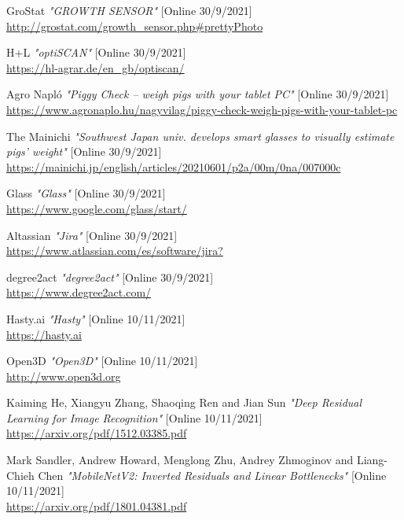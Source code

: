 ﻿\documentclass[10pt,a4paper,twocolumn,twoside]{article}
\begin{document}
\begin{thebibliography}{11}
    GroStat \emph{"GROWTH SENSOR"} [Online 30/9/2021] \\
    \url{http://grostat.com/growth_sensor.php#prettyPhoto}

    H+L \emph{"optiSCAN"} [Online 30/9/2021] \\
    \url{https://hl-agrar.de/en_gb/optiscan/}

    Agro Napló \emph{"Piggy Check – weigh pigs with your tablet PC"} [Online 30/9/2021] \\
    \url{https://www.agronaplo.hu/nagyvilag/piggy-check-weigh-pigs-with-your-tablet-pc}

    The Mainichi \emph{"Southwest Japan univ. develops smart glasses to visually estimate pigs' weight"} [Online 30/9/2021] \\
    \url{https://mainichi.jp/english/articles/20210601/p2a/00m/0na/007000c}

    Glass \emph{"Glass"} [Online 30/9/2021] \\
    \url{https://www.google.com/glass/start/}

    Altassian \emph{"Jira"} [Online 30/9/2021] \\
    \url{https://www.atlassian.com/es/software/jira?}

    degree2act \emph{"degree2act"} [Online 30/9/2021] \\
    \url{https://www.degree2act.com/}
    

    Hasty.ai \emph{"Hasty"} [Online 10/11/2021] \\
    \url{https://hasty.ai}



    Open3D \emph{"Open3D"} [Online 10/11/2021] \\
    \url{http://www.open3d.org}

    
    Kaiming He, Xiangyu Zhang, Shaoqing Ren and Jian Sun \emph{"Deep Residual Learning for Image Recognition"} [Online 10/11/2021] \\
    \url{https://arxiv.org/pdf/1512.03385.pdf}

    Mark Sandler, Andrew Howard, Menglong Zhu, Andrey Zhmoginov and Liang-Chieh Chen \emph{"MobileNetV2: Inverted Residuals and Linear Bottlenecks"} [Online 10/11/2021] \\
    \url{https://arxiv.org/pdf/1801.04381.pdf}


\end{thebibliography}
\end{document}

